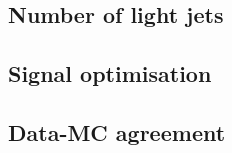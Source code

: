 \newpage
\subsection{Number of light jets}

\subsection{Signal optimisation}

\subsection{Data-MC agreement}